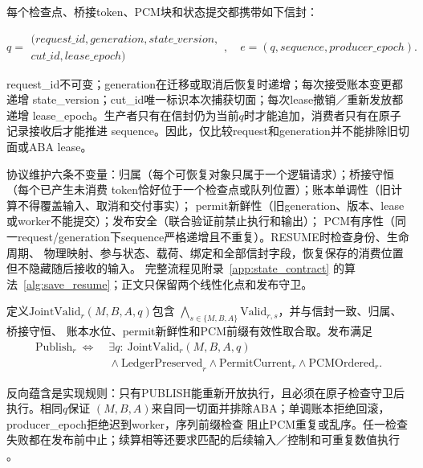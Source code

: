 \documentclass{article}
\begin{document}
每个检查点、桥接token、PCM块和状态提交都携带如下信封：

\begin{equation*}
  q=\begin{gathered}\bigl(\mathit{request\_id},\mathit{generation},
     \mathit{state\_version},\\[-2pt]
     \mathit{cut\_id},\mathit{lease\_epoch}\bigr)\end{gathered},
  \quad e=(q,\mathit{sequence},\mathit{producer\_epoch}).
\end{equation*}

request\_id不可变；generation在迁移或取消后恢复时递增；每次接受账本变更都递增
state\_version；cut\_id唯一标识本次捕获切面；每次lease撤销／重新发放都递增
lease\_epoch。生产者只有在信封仍为当前$q$时才能追加，消费者只有在原子记录接收后才能推进
sequence。因此，仅比较request和generation并不能排除旧切面或ABA lease。

协议维护六条不变量：归属（每个可恢复对象只属于一个逻辑请求）；桥接守恒（每个已产生未消费
token恰好位于一个检查点或队列位置）；账本单调性（旧计算不得覆盖输入、取消和交付事实）；
permit新鲜性（旧generation、版本、lease或worker不能提交）；发布安全（联合验证前禁止执行和输出）；
PCM有序性（同一request/generation下sequence严格递增且不重复）。RESUME时检查身份、生命周期、
物理映射、参与状态、载荷、绑定和全部信封字段，恢复保存的消费位置但不隐藏随后接收的输入。
完整流程见附录~\ref{app:state_contract} 的算法~\ref{alg:save_resume}；正文只保留两个线性化点和发布守卫。

定义$\mathrm{JointValid}_r(M,B,A,q)$包含
$\bigwedge_{s\in\{M,B,A\}}\mathrm{Valid}_{r,s}$，并与信封一致、归属、桥接守恒、
账本水位、permit新鲜性和PCM前缀有效性取合取。发布满足
\begin{equation}
\begin{aligned}
    \mathrm{Publish}_r \ \Longleftrightarrow\;&
    \exists q:\ \mathrm{JointValid}_r(M,B,A,q) \\
    &{}\land \mathrm{LedgerPreserved}_r
    \land \mathrm{PermitCurrent}_r
    \land \mathrm{PCMOrdered}_r .
\end{aligned}
\label{eq:publish_guard}
\end{equation}

反向蕴含是实现规则：只有PUBLISH能重新开放执行，且必须在原子检查守卫后执行。相同$q$保证
$(M,B,A)$来自同一切面并排除ABA；单调账本拒绝回滚，producer\_epoch拒绝迟到worker，序列前缀检查
阻止PCM重复或乱序。任一检查失败都在发布前中止；续算相等还要求匹配的后续输入／控制和可重复数值执行
\citep{pytorchreproducibility}。
\end{document}
